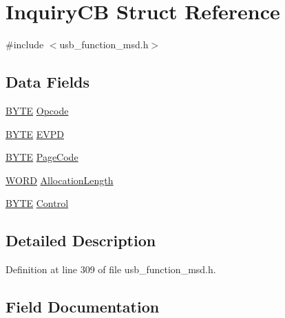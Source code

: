 \hypertarget{struct_inquiry_c_b}{}\section{Inquiry\+C\+B Struct Reference}
\label{struct_inquiry_c_b}


{\ttfamily \#include $<$usb\+\_\+function\+\_\+msd.\+h$>$}

\subsection*{Data Fields}
\begin{DoxyCompactItemize}
\item 
\hyperlink{_generic_type_defs_8h_a4ae1dab0fb4b072a66584546209e7d58}{B\+Y\+T\+E} \hyperlink{struct_inquiry_c_b_a3ac7536b907732d60214ae553910eed9}{Opcode}
\item 
\hyperlink{_generic_type_defs_8h_a4ae1dab0fb4b072a66584546209e7d58}{B\+Y\+T\+E} \hyperlink{struct_inquiry_c_b_a0da48c2e152b21f86bc8b04897fa1e8c}{E\+V\+P\+D}
\item 
\hyperlink{_generic_type_defs_8h_a4ae1dab0fb4b072a66584546209e7d58}{B\+Y\+T\+E} \hyperlink{struct_inquiry_c_b_a53ee9769775f645af63931eb0fef7922}{Page\+Code}
\item 
\hyperlink{_generic_type_defs_8h_a2b0e863dadf920709ec53d9088ee7c91}{W\+O\+R\+D} \hyperlink{struct_inquiry_c_b_a9cdd461d43ce26b92074bac3b76c6510}{Allocation\+Length}
\item 
\hyperlink{_generic_type_defs_8h_a4ae1dab0fb4b072a66584546209e7d58}{B\+Y\+T\+E} \hyperlink{struct_inquiry_c_b_a5dc24656c27deb12af74c98930f0bfc5}{Control}
\end{DoxyCompactItemize}


\subsection{Detailed Description}


Definition at line 309 of file usb\+\_\+function\+\_\+msd.\+h.



\subsection{Field Documentation}
\hypertarget{struct_inquiry_c_b_a9cdd461d43ce26b92074bac3b76c6510}{}
